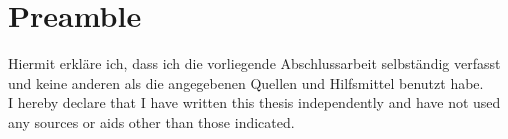 \section*{Preamble}
Hiermit erkläre ich, dass ich die vorliegende Abschlussarbeit selbständig
verfasst und keine anderen als die angegebenen Quellen und Hilfsmittel
benutzt habe.\\
I hereby declare that I have written this thesis independently and have not used any sources or aids other than those indicated.
\pagebreak
